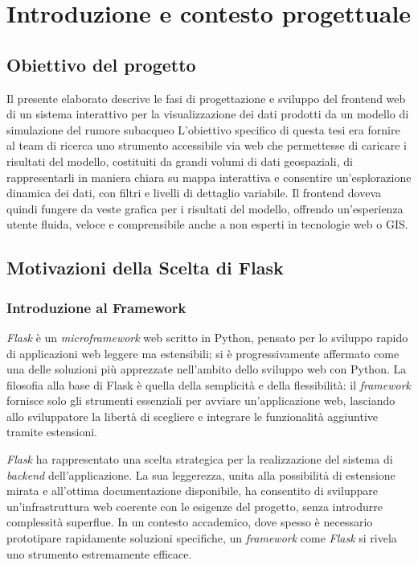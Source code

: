 \chapter{Introduzione e contesto progettuale}
\label{ch:introduzione}

\section{Obiettivo del progetto}

Il presente elaborato descrive le fasi di progettazione e sviluppo del frontend web di un sistema interattivo per la visualizzazione dei dati prodotti da un modello di simulazione del rumore subacqueo
L'obiettivo specifico di questa tesi era fornire al team di ricerca uno strumento accessibile via web che permettesse di caricare i risultati del modello, costituiti da grandi volumi di dati geospaziali, di rappresentarli in maniera chiara su mappa interattiva e consentire un'esplorazione dinamica dei dati, con filtri e livelli di dettaglio variabile.
Il frontend doveva quindi fungere da veste grafica per i risultati del modello, offrendo un'esperienza utente fluida, veloce e comprensibile anche a non esperti in tecnologie web o GIS.



\section{Motivazioni della Scelta di Flask}
\label{ch:flask}

\subsection{Introduzione al Framework}
\textit{Flask} è un \textit{microframework} web scritto in Python, pensato per lo sviluppo rapido di applicazioni web leggere ma estensibili; si è progressivamente affermato come una delle soluzioni più apprezzate nell'ambito dello sviluppo web con Python.  
La filosofia alla base di Flask è quella della semplicità e della flessibilità: il \textit{framework} fornisce solo gli strumenti essenziali per avviare un'applicazione web, lasciando allo sviluppatore la libertà di scegliere e integrare le funzionalità aggiuntive tramite estensioni. \cite{flask-docs}

\textit{Flask} ha rappresentato una scelta strategica per la realizzazione del sistema di \textit{backend} dell'applicazione. La sua leggerezza, unita alla possibilità di estensione mirata e all'ottima documentazione disponibile, ha consentito di sviluppare un'infrastruttura web coerente con le esigenze del progetto, senza introdurre complessità superflue. In un contesto accademico, dove spesso è necessario prototipare rapidamente soluzioni specifiche, un \textit{framework} come \textit{Flask} si rivela uno strumento estremamente efficace.

